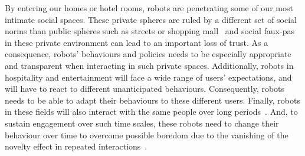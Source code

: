     By entering our homes or hotel rooms, robots are penetrating some of our most intimate social spaces. These private spheres are ruled by a different set of social norms than public spheres such as streets or shopping mall~\citep{weintraub1997theory} and social faux-pas in these private environment can lead to an important loss of trust. As a consequence, robots' behaviours and policies needs to be especially appropriate and transparent when interacting in such private spaces. Additionally, robots in hospitality and entertainment will face a wide range of users' expectations, and will have to react to different unanticipated behaviours. Consequently, robots needs to be able to adapt their behaviours to these different users. Finally, robots in these fields will also interact with the same people over long periods~\citep{leite2013social}. And, to sustain engagement over such time scales, these robots need to change their behaviour over time to overcome possible boredom due to the vanishing of the novelty effect in repeated interactions~\citep{salter2004robots}.%

